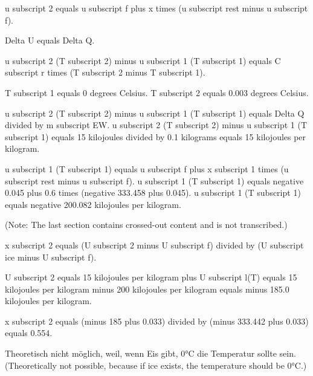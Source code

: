 u subscript 2 equals u subscript f plus x times (u subscript rest minus u subscript f).  

Delta U equals Delta Q.  

u subscript 2 (T subscript 2) minus u subscript 1 (T subscript 1) equals C subscript r times (T subscript 2 minus T subscript 1).  

T subscript 1 equals 0 degrees Celsius.  
T subscript 2 equals 0.003 degrees Celsius.  

u subscript 2 (T subscript 2) minus u subscript 1 (T subscript 1) equals Delta Q divided by m subscript EW.  
u subscript 2 (T subscript 2) minus u subscript 1 (T subscript 1) equals 15 kilojoules divided by 0.1 kilograms equals 15 kilojoules per kilogram.  

u subscript 1 (T subscript 1) equals u subscript f plus x subscript 1 times (u subscript rest minus u subscript f).  
u subscript 1 (T subscript 1) equals negative 0.045 plus 0.6 times (negative 333.458 plus 0.045).  
u subscript 1 (T subscript 1) equals negative 200.082 kilojoules per kilogram.  

(Note: The last section contains crossed-out content and is not transcribed.)

x subscript 2 equals (U subscript 2 minus U subscript f) divided by (U subscript ice minus U subscript f).  

U subscript 2 equals 15 kilojoules per kilogram plus U subscript l(T) equals 15 kilojoules per kilogram minus 200 kilojoules per kilogram equals minus 185.0 kilojoules per kilogram.  

x subscript 2 equals (minus 185 plus 0.033) divided by (minus 333.442 plus 0.033) equals 0.554.  

Theoretisch nicht möglich, weil, wenn Eis gibt, 0°C die Temperatur sollte sein.  
(Theoretically not possible, because if ice exists, the temperature should be 0°C.)